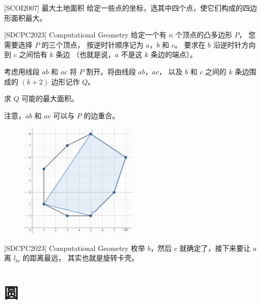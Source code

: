 \documentclass{beamer}
\begin{document}
\begin{frame}{[SCOI2007] 最大土地面积}
    \small
    给定一些点的坐标，选其中四个点，使它们构成的四边形面积最大。
\end{frame}

\begin{frame}{ [SDCPC2023] Computational Geometry}
    \footnotesize
    给定一个有 $n$ 个顶点的凸多边形 $P$，
    您需要选择 $P$ 的三个顶点，
    按逆时针顺序记为 $a$，$b$ 和 $c$。
    要求在 $b$ 沿逆时针方向到 $c$ 之间恰有 $k$ 条边
    （也就是说，$a$ 不是这 $k$ 条边的端点）。

    考虑用线段 $ab$ 和 $ac$ 将 $P$ 割开。将由线段 $ab$，$ac$，
    以及 $b$ 和 $c$ 之间的 $k$ 条边围成的 $(k + 2)$ 边形记作 $Q$。
    
    求 $Q$ 可能的最大面积。
    
    注意，$ab$ 和 $ac$ 可以与 $P$ 的边重合。

    \begin{figure}[H]
        \centering
        \includegraphics[width=0.5\textwidth]{pic/sdcpc2023sample.png}
    \end{figure}
\end{frame}

\begin{frame}{ [SDCPC2023] Computational Geometry}
    \small
    枚举 $b$，然后 $c$ 就确定了，接下来要让 $a$ 离 $l_{bc}$ 的距离最远，
    其实也就是旋转卡壳。
\end{frame}

\section{圆}
\end{document}
